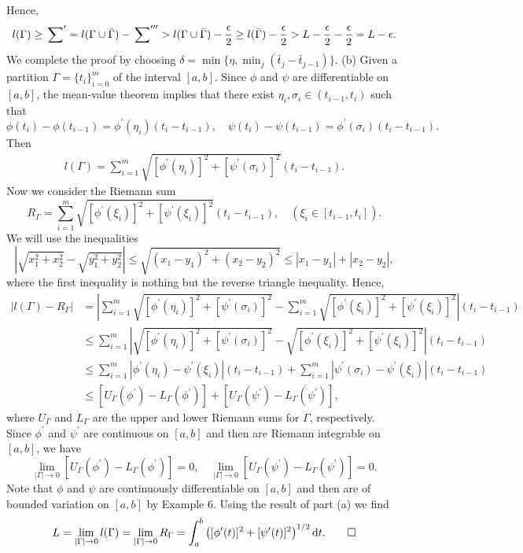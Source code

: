 \begin{exercise}{2.9}
\begin{equation*}
  \end{equation*}
  Hence,
  $$l(\Gamma)\geq\sideset{}{'}{\sum}=l(\Gamma\cup \bar{\Gamma})-\sideset{}{'''}{\sum}>l(\Gamma\cup \bar{\Gamma})-\frac{\epsilon}{2}\geq l(\bar{\Gamma})-\frac{\epsilon}{2}>L-\frac{\epsilon}{2}-\frac{\epsilon}{2}=L-\epsilon.$$
  We complete the proof by choosing $\delta=\min\{\eta,\min_j(\bar{t}_j-\bar{t}_{j-1})\}$.
  (b)
  Given a partition $\Gamma=\{t_i\}_{i=0}^m$
  of the interval $[a,b]$.
  Since $\phi$ and $\psi$ are differentiable on $[a,b]$, the mean-value theorem implies that there exist $\eta_i,\sigma_i\in (t_{i-1},t_i)$ such that
  $$\phi(t_i)-\phi(t_{i-1})=\phi^\prime(\eta_i)(t_i-t_{i-1}),\quad \psi(t_i)-\psi(t_{i-1})=\phi^\prime(\sigma_i)(t_i-t_{i-1}).$$
  Then
  \begin{equation*}
    \begin{aligned}
      l(\Gamma)=\sum_{i=1}^m\sqrt{[\phi^\prime(\eta_i)]^2+[\psi^\prime(\sigma_i)]^2}(t_i-t_{i-1}).
    \end{aligned}
  \end{equation*}
  Now we consider the Riemann sum
  $$R_\Gamma=\sum_{i=1}^m\sqrt{[\phi^\prime(\xi_i)]^2+[\psi^\prime(\xi_i)]^2}(t_i-t_{i-1}),\quad (\xi_i\in[t_{i-1},t_i]).$$
  We will use the inequalities
  \begin{equation*}
    \left|\sqrt{x_1^2+x_2^2}-\sqrt{y_1^2+y_2^2}\right|\leq \sqrt{(x_1-y_1)^2+(x_2-y_2)^2}\leq |x_1-y_1|+|x_2-y_2|,
  \end{equation*}
  where the first inequality is nothing but the reverse triangle inequality.
  Hence,
  \begin{equation*}
    \begin{aligned}
      |l(\Gamma)-R_\Gamma|&=\left|\sum_{i=1}^m\sqrt{[\phi^\prime(\eta_i)]^2+[\psi^\prime(\sigma_i)]^2}-\sum_{i=1}^m\sqrt{[\phi^\prime(\xi_i)]^2+[\psi^\prime(\xi_i)]^2}\right|(t_i-t_{i-1})\\&\leq\sum_{i=1}^m\left|\sqrt{[\phi^\prime(\eta_i)]^2+[\psi^\prime(\sigma_i)]^2}-\sqrt{[\phi^\prime(\xi_i)]^2+[\psi^\prime(\xi_i)]^2}\right|(t_i-t_{i-1})\\
      &\leq\sum_{i=1}^m|\phi^\prime(\eta_i)-\psi^\prime(\xi_i)|(t_i-t_{i-1})+\sum_{i=1}^m|\psi^\prime(\sigma_i)-\psi^\prime(\xi_i)|(t_i-t_{i-1})\\
      &\leq [U_\Gamma(\phi^\prime)-L_\Gamma(\phi^\prime)]+[U_\Gamma(\psi^\prime)-L_\Gamma(\psi^\prime)],
    \end{aligned}
  \end{equation*}
  where $U_\Gamma$ and $L_\Gamma$ are the upper and lower Riemann sums for $\Gamma$, respectively. Since $\phi^\prime$ and $\psi^\prime$ are continuous on $[a,b]$ and then are Riemann integrable on $[a,b]$, we have
  $$\lim_{|\Gamma|\to 0}[U_\Gamma(\phi^\prime)-L_\Gamma(\phi^\prime)]=0,\quad \lim_{|\Gamma|\to 0}[U_\Gamma(\psi^\prime)-L_\Gamma(\psi^\prime)]=0.$$
  Note that $\phi$ and $\psi$ are continuously differentiable on $[a,b]$ and then are of bounded variation on $[a,b]$ by Example 6. Using the result of part (a) we find
  \[L=\lim_{|\Gamma|\to0}l(\Gamma)=\lim_{|\Gamma|\to0}R_\Gamma=\int_a^b\left([\phi^\prime(t)]^2+[\psi^\prime(t)]^2\right)^{1/2}\mathrm{d}t. \qedhere \]
\end{exercise}

